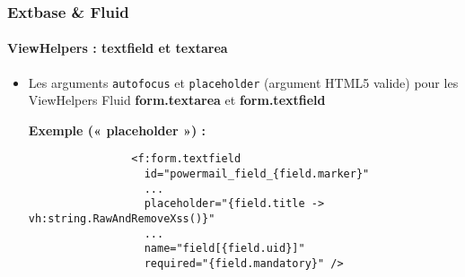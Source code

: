 
\begin{frame}[fragile]
	\frametitle{Extbase \& Fluid}
	\framesubtitle{ViewHelpers : textfield et textarea}

	\begin{itemize}
		\item Les arguments \texttt{autofocus} et \texttt{placeholder} (argument HTML5 valide) pour les ViewHelpers Fluid \textbf{form.textarea} et \textbf{form.textfield}\newline

			\smaller\textbf{Exemple (« placeholder ») :}\normalsize
			\begin{lstlisting}
				<f:form.textfield
				  id="powermail_field_{field.marker}"
				  ...
				  placeholder="{field.title -> vh:string.RawAndRemoveXss()}"
				  ...
				  name="field[{field.uid}]"
				  required="{field.mandatory}" />
			\end{lstlisting}

	\end{itemize}

\end{frame}


